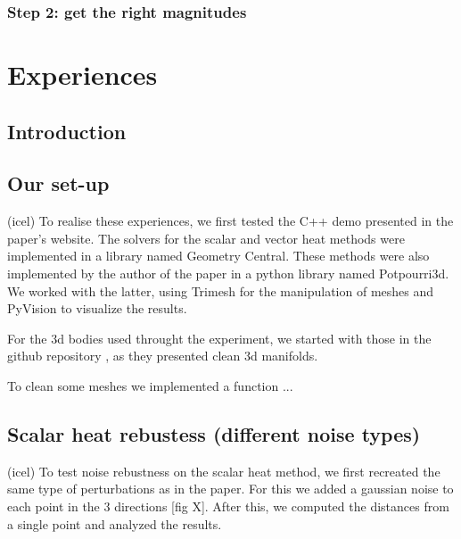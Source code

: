 \documentclass[sigconf]{acmart}
\begin{document}
\subsubsection{Step 2: get the right magnitudes}
\begin{comment}
\begin{algorithm}
\caption{An algorithm with caption}\label{alg:cap}
\begin{algorithmic}
\Require $n \geq 0$
\Ensure $y = x^n$
\State $y \gets 1$
\State $X \gets x$
\State $N \gets n$
\While{$N \neq 0$}
\If{$N$ is even}
    \State $X \gets X \times X$
    \State $N \gets \frac{N}{2}$  \Comment{This is a comment}
\ElsIf{$N$ is odd}
    \State $y \gets y \times X$
    \State $N \gets N - 1$
\EndIf
\EndWhile
\end{algorithmic}
\end{algorithm}
\end{comment}

\section{Experiences}
\subsection{Introduction}

\subsection{Our set-up}
(icel)
To realise these experiences, we first tested the C++ demo presented in the paper's website. The solvers for the scalar and vector heat methods were implemented in a library named Geometry Central. These methods were also implemented by the author of the paper in a python library named Potpourri3d. We worked with the latter, using Trimesh for the manipulation of meshes and PyVision to visualize the results.

For the 3d bodies used throught the experiment, we started with those in the github repository \cite{github_objects_repo}, as they presented clean 3d manifolds.

To clean some meshes we implemented a function ...

\subsection{Scalar heat rebustess (different noise types)}
(icel)
To test noise rebustness on the scalar heat method, we first recreated the same type of perturbations as in the paper. For this we added a gaussian noise to each point in the 3 directions [fig X]. After this, we computed the distances from a single point and analyzed the results.
\end{document}
